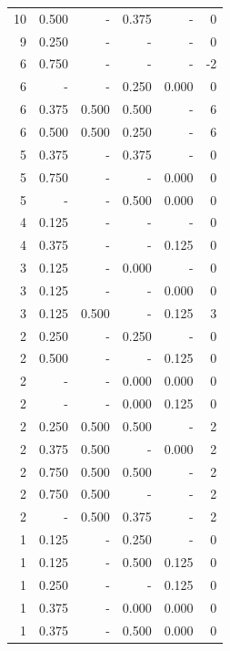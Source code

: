 \documentclass[a4paper]{article}\usepackage{graphicx, color}
\begin{document}
\begin{table}[ht]
\begin{tabular}{rrrrrr}
   \rowcolor{sosoColor} 10 & 0.500 & - & 0.375 & - & 0 \\ 
   \rowcolor{nullColor} 9 & 0.250 & - & - & - & 0 \\ 
   \rowcolor{nullColor} 6 & 0.750 & - & - & - & -2 \\ 
   \rowcolor{sosoColor} 6 & - & - & 0.250 & 0.000 & 0 \\ 
   \rowcolor{goodColor} 6 & 0.375 & 0.500 & 0.500 & - & 6 \\ 
   \rowcolor{badColor} 6 & 0.500 & 0.500 & 0.250 & - & 6 \\ 
   \rowcolor{sosoColor} 5 & 0.375 & - & 0.375 & - & 0 \\ 
   \rowcolor{nullColor} 5 & 0.750 & - & - & 0.000 & 0 \\ 
   \rowcolor{sosoColor} 5 & - & - & 0.500 & 0.000 & 0 \\ 
   \rowcolor{nullColor} 4 & 0.125 & - & - & - & 0 \\ 
   \rowcolor{nullColor} 4 & 0.375 & - & - & 0.125 & 0 \\ 
   \rowcolor{sosoColor} 3 & 0.125 & - & 0.000 & - & 0 \\ 
   \rowcolor{nullColor} 3 & 0.125 & - & - & 0.000 & 0 \\ 
  3 & 0.125 & 0.500 & - & 0.125 & 3 \\ 
   \rowcolor{sosoColor} 2 & 0.250 & - & 0.250 & - & 0 \\ 
   \rowcolor{nullColor} 2 & 0.500 & - & - & 0.125 & 0 \\ 
   \rowcolor{sosoColor} 2 & - & - & 0.000 & 0.000 & 0 \\ 
   \rowcolor{sosoColor} 2 & - & - & 0.000 & 0.125 & 0 \\ 
   \rowcolor{goodColor} 2 & 0.250 & 0.500 & 0.500 & - & 2 \\ 
  2 & 0.375 & 0.500 & - & 0.000 & 2 \\ 
   \rowcolor{goodColor} 2 & 0.750 & 0.500 & 0.500 & - & 2 \\ 
  2 & 0.750 & 0.500 & - & - & 2 \\ 
  2 & - & 0.500 & 0.375 & - & 2 \\ 
   \rowcolor{sosoColor} 1 & 0.125 & - & 0.250 & - & 0 \\ 
   \rowcolor{sosoColor} 1 & 0.125 & - & 0.500 & 0.125 & 0 \\ 
   \rowcolor{nullColor} 1 & 0.250 & - & - & 0.125 & 0 \\ 
   \rowcolor{sosoColor} 1 & 0.375 & - & 0.000 & 0.000 & 0 \\ 
   \rowcolor{sosoColor} 1 & 0.375 & - & 0.500 & 0.000 & 0 \\ 

\end{tabular}
\end{table}
\end{document}
